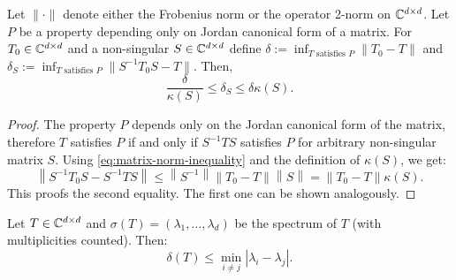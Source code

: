 \begin{lemma}\label{lemma} %
    Let $\| \cdot \|$ denote either the Frobenius norm or the operator 2-norm on $\mathbb{C}^{d\times d}$. Let $P$ be a property depending only on Jordan canonical form of a matrix. For $T_0 \in \mathbb{C}^{d\times d}$ and a non-singular $S \in \mathbb{C}^{d \times d}$ define $\delta := \inf_{T \text{ satisfies } P}  \|T_0 - T\|$ and $\delta_S := \inf_{T \text{ satisfies } P} \|S^{-1}T_0S - T\|$. Then,
    \begin{equation*}
        \frac{\delta}{\kappa(S)} \leqslant \delta_S \leqslant \delta\kappa(S).
    \end{equation*}
\end{lemma}
\begin{proof}
    The property $P$ depends only on the Jordan canonical form of the matrix, therefore $T$ satisfies $P$ if and only if $S^{-1}TS$ satisfies $P$ for arbitrary non-singular matrix $S$. Using \eqref{eq:matrix-norm-inequality} and the definition of $\kappa(S)$, we get:
    \begin{equation*}
        \left\|S^{-1} T_0 S - S^{-1} T S \right\| \leqslant \left\|S^{-1}\right\| \left\|T_0 - T\right\| \left\|S\right\| = \|T_0-T\|\kappa(S).
    \end{equation*}
    This proofs the second equality. The first one can be shown analogously.
\end{proof}
\begin{theorem}
Let $T \in \mathbb{C}^{d \times d}$ and $\sigma(T) = (\lambda_1, \dots, \lambda_d)$ be the spectrum of $T$ (with multiplicities counted). Then: 
\begin{equation*}
    \delta(T) \leqslant \min_{i\neq j} |\lambda_i - \lambda_j|.
\end{equation*}
\end{theorem}
